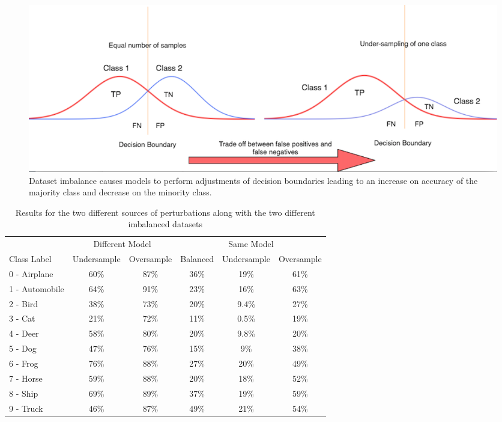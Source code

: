 \begin{figure}[H]
	\centering
	\includegraphics[scale=0.32]{class_dist.png}
	\caption{Dataset imbalance causes models to perform adjustments of decision boundaries leading to an increase on accuracy of the majority class and decrease on the minority class.}
	\label{fig:class_dist}
\end{figure}



\begin{table}[H]
	\centering
	
	\begin{tabular}{lccccc}
		\toprule
		&\multicolumn{2}{c}{Different Model}
		&\multicolumn{3}{c}{Same Model}
		\\\cmidrule(r){2-3}\cmidrule(l){4-6}
		Class Label &Undersample &Oversample &Balanced &Undersample &Oversample \\
		\midrule
		0 - Airplane &60\%& 87\% &36\%& 19\%    & 61\% \\
		1 - Automobile &64\%& 91\% &23\%& 16\%    & 63\% \\
		2 - Bird &38\%& 73\% &20\%& 9.4\%    & 27\% \\
		3 - Cat &21\%& 72\% &11\%& 0.5\%    & 19\% \\
		4 - Deer &58\%& 80\% &20\%& 9.8\%    & 20\% \\
		5 - Dog &47\%& 76\% &15\%& 9\%    & 38\% \\
		6 - Frog &76\%& 88\% &27\%& 20\%    & 49\% \\
		7 - Horse &59\%& 88\% &20\%& 18\%    & 52\% \\
		8 - Ship &69\%& 89\% &37\%& 19\%    & 59\% \\
		9 - Truck &46\%& 87\% &49\%& 21\%    & 54\% \\
		\bottomrule
	\end{tabular}
	\caption{Results for the two different sources of perturbations along with the two different imbalanced datasets}
	\label{tbl:results}
\end{table}


